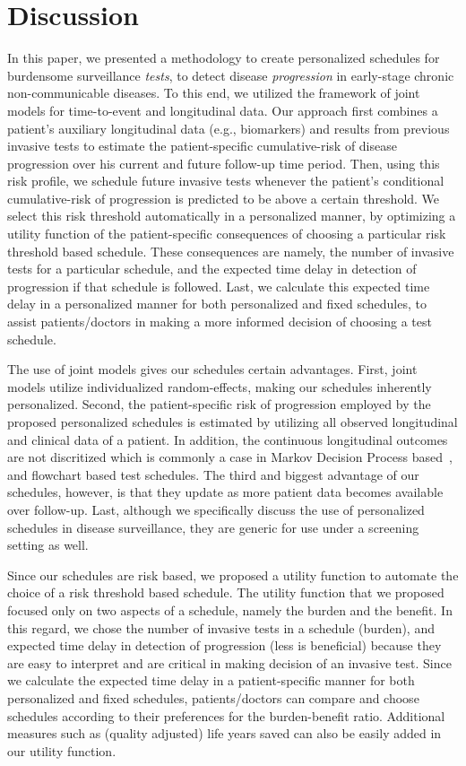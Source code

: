 \section{Discussion}
\label{sec:discussion}
In this paper, we presented a methodology to create personalized schedules for burdensome surveillance \textit{tests}, to detect disease \textit{progression} in early-stage chronic non-communicable diseases. To this end, we utilized the framework of joint models for time-to-event and longitudinal data. Our approach first combines a patient's auxiliary longitudinal data (e.g., biomarkers) and results from previous invasive tests to estimate the patient-specific cumulative-risk of disease progression over his current and future follow-up time period. Then, using this risk profile, we schedule future invasive tests whenever the patient's conditional cumulative-risk of progression is predicted to be above a certain threshold. We select this risk threshold automatically in a personalized manner, by optimizing a utility function of the patient-specific consequences of choosing a particular risk threshold based schedule. These consequences are namely, the number of invasive tests for a particular schedule, and the expected time delay in detection of progression if that schedule is followed. Last, we calculate this expected time delay in a personalized manner for both personalized and fixed schedules, to assist patients/doctors in making a more informed decision of choosing a test schedule.

The use of joint models gives our schedules certain advantages. First, joint models utilize individualized random-effects, making our schedules inherently personalized. Second, the patient-specific risk of progression employed by the proposed personalized schedules is estimated by utilizing all observed longitudinal and clinical data of a patient. In addition, the continuous longitudinal outcomes are not discritized which is commonly a case in Markov Decision Process based~\citep{alagoz2010operations, steimle2017markov}, and flowchart based test schedules. The third and biggest advantage of our schedules, however, is that they update as more patient data becomes available over follow-up. Last, although we specifically discuss the use of personalized schedules in disease surveillance, they are generic for use under a screening setting as well.

Since our schedules are risk based, we proposed a utility function to automate the choice of a risk threshold based schedule. The utility function that we proposed focused only on two aspects of a schedule, namely the burden and the benefit. In this regard, we chose the number of invasive tests in a schedule (burden), and expected time delay in detection of progression (less is beneficial) because they are easy to interpret and are critical in making decision of an invasive test. Since we calculate the expected time delay in a patient-specific manner for both personalized and fixed schedules, patients/doctors can compare and choose schedules according to their preferences for the burden-benefit ratio. Additional measures such as (quality adjusted) life years saved can also be easily added in our utility function. 

